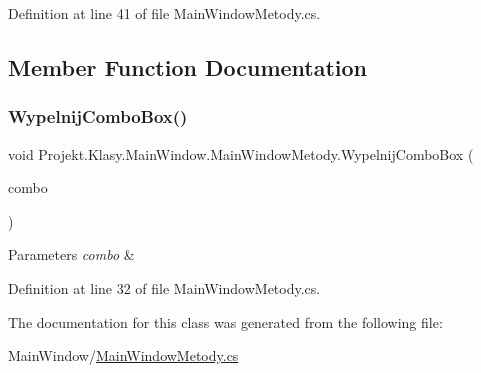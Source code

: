 Definition at line 41 of file Main\+Window\+Metody.\+cs.



\subsection{Member Function Documentation}
\mbox{\label{class_projekt_1_1_klasy_1_1_main_window_1_1_main_window_metody_a0949895d8b695fb1ae87b383df0ee915}} 
\subsubsection{\texorpdfstring{WypelnijComboBox()}{WypelnijComboBox()}}
{\footnotesize\ttfamily void Projekt.\+Klasy.\+Main\+Window.\+Main\+Window\+Metody.\+Wypelnij\+Combo\+Box (\begin{DoxyParamCaption}\item[{Combo\+Box}]{combo }\end{DoxyParamCaption})}






\begin{DoxyParams}{Parameters}
{\em combo} & \\
\hline
\end{DoxyParams}


Definition at line 32 of file Main\+Window\+Metody.\+cs.



The documentation for this class was generated from the following file\+:\begin{DoxyCompactItemize}
\item 
Main\+Window/\mbox{\hyperlink{_main_window_metody_8cs}{Main\+Window\+Metody.\+cs}}\end{DoxyCompactItemize}
